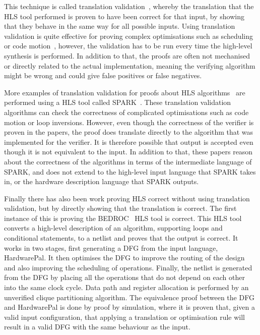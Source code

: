 This technique is called translation validation~\cite{pnueli98_trans}, whereby
the translation that the HLS tool performed is proven to have been correct for
that input, by showing that they behave in the same way for all possible inputs.
Using translation validation is quite effective for proving complex
optimisations such as scheduling~\cite{kim04_autom_fsmd,
  karfa06_formal_verif_method_sched_high_synth,
  chouksey20_verif_sched_condit_behav_high_level_synth} or code
motion~\cite{banerjee14_verif_code_motion_techn_using_value_propag,
  chouksey19_trans_valid_code_motion_trans_invol_loops}, however, the validation
has to be run every time the high-level synthesis is performed.  In addition to
that, the proofs are often not mechanised or directly related to the actual
implementation, meaning the verifying algorithm might be wrong and could give
false positives or false negatives.

More examples of translation validation for proofs about HLS
algorithms~\cite{karfa06_formal_verif_method_sched_high_synth,
  karfa07_hand_verif_high_synth, kundu07_autom,
  karfa08_equiv_check_method_sched_verif, kundu08_valid_high_level_synth,
  karfa10_verif_datap_contr_gener_phase, karfa12_formal_verif_code_motion_techn,
  chouksey19_trans_valid_code_motion_trans_invol_loops,
  chouksey20_verif_sched_condit_behav_high_level_synth} are performed using a
HLS tool called SPARK~\cite{gupta03_spark}.  These translation validation
algorithms can check the correctness of complicated optimisations such as code
motion or loop inversions.  However, even though the correctness of the verifier
is proven in the papers, the proof does translate directly to the algorithm that
was implemented for the verifier.  It is therefore possible that output is
accepted even though it is not equivalent to the input.  In addition to that,
these papers reason about the correctness of the algorithms in terms of the
intermediate language of SPARK, and does not extend to the high-level input
language that SPARK takes in, or the hardware description language that SPARK
outputs.

Finally there has also been work proving HLS correct without using translation
validation, but by directly showing that the translation is correct.  The first
instance of this is proving the BEDROC~\cite{chapman92_verif_bedroc} HLS tool is
correct.  This HLS tool converts a high-level description of an algorithm,
supporting loops and conditional statements, to a netlist and proves that the
output is correct.  It works in two stages, first generating a DFG from the
input language, HardwarePal.  It then optimises the DFG to improve the routing
of the design and also improving the scheduling of operations.  Finally, the
netlist is generated from the DFG by placing all the operations that do not
depend on each other into the same clock cycle.  Data path and register
allocation is performed by an unverified clique partitioning algorithm.  The
equivalence proof between the DFG and HardwarePal is done by proof by
simulation, where it is proven that, given a valid input configuration, that
applying a translation or optimisation rule will result in a valid DFG with the
same behaviour as the input.

